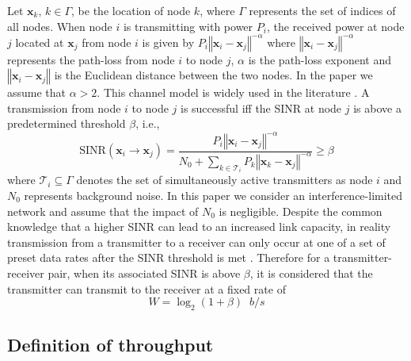 \documentclass[english]{IEEEtran}
\theoremstyle{plain}
\theoremstyle{plain}
\theoremstyle{plain}
\theoremstyle{remark}
\begin{document}
Let $\boldsymbol{x}_{k},\, k\in\Gamma$, be the location of node $k$,
where $\Gamma$ represents the set of indices of all nodes. When node
$i$ is transmitting with power $P_{i}$, the received power at node
$j$ located at $\boldsymbol{x}_{j}$ from node $i$ is given by $P_{i}\left\Vert \boldsymbol{x}_{i}-\boldsymbol{x}_{j}\right\Vert ^{-\alpha}$
where $\left\Vert \boldsymbol{x}_{i}-\boldsymbol{x}_{j}\right\Vert ^{-\alpha}$
represents the path-loss from node $i$ to node $j$, $\alpha$ is
the path-loss exponent and $\left\Vert \boldsymbol{x}_{i}-\boldsymbol{x}_{j}\right\Vert $
is the Euclidean distance between the two nodes. In the paper we assume
that $\alpha>2$. This channel model is widely used in the literature
\cite{Haenggi09Interference,Franceschetti07Closing,Gupta00Capacity,Chau11Capacity}.
A transmission from node $i$ to node $j$ is successful iff the SINR
at node $j$ is above a predetermined threshold $\beta$, i.e.,
\begin{equation}
\textrm{SINR}\left(\boldsymbol{x}_{i}\rightarrow\boldsymbol{x}_{j}\right)=\frac{P_{i}\left\Vert \boldsymbol{x}_{i}-\boldsymbol{x}_{j}\right\Vert ^{-\alpha}}{N_{0}+\underset{k\in\mathcal{T}_{i}}{\sum}P_{k}\left\Vert \boldsymbol{x}_{k}-\boldsymbol{x}_{j}\right\Vert ^{-\alpha}}\geq\beta\label{eq:SINR}
\end{equation}
where $\mathcal{T}_{i}\subseteq\Gamma$ denotes the set of simultaneously
active transmitters as node $i$ and $N_{0}$ represents background
noise. In this paper we consider an interference-limited network and
assume that the impact of $N_{0}$ is negligible. Despite the common
knowledge that a higher SINR can lead to an increased link capacity,
in reality transmission from a transmitter to a receiver can only
occur at one of a set of preset data rates after the SINR threshold
is met \cite{Kim08Understanding,Lin07Interplay}. Therefore for a
transmitter-receiver pair, when its associated SINR is above $\beta$,
it is considered that the transmitter can transmit to the receiver
at a fixed rate of 
\begin{equation}
W=\log_{2}\left(1+\beta\right)\;\; b/s\label{eq:data rate definition}
\end{equation}



\subsection{Definition of throughput\label{sub:Definition-of-throughput}}
\end{document}
